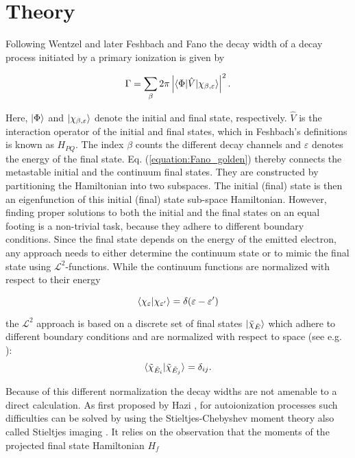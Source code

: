 \section{Theory}
\label{section:theory}

Following Wentzel \cite{Wentzel27} and later Feshbach \cite{Feshbach58,Feshbach62}
and Fano \cite{Fano61}
the decay width of a decay process initiated by a
primary ionization is given by 

\begin{equation} \label{equation:Fano_golden}
  \Gamma = \sum_\beta 2\pi
           \left| \braket{\Phi|\hat{V}|\chi_{\beta,\varepsilon}} \right|^2 .
\end{equation}

Here, $\ket{\Phi}$ and $\ket{\chi_{\beta,\varepsilon}}$ denote the initial and
final state, respectively. $\hat{V}$ is the interaction operator of the
initial and final states, which in Feshbach's definitions is known as $H_{PQ}$.
The index $\beta$ counts the different
decay channels and $\varepsilon$ denotes the energy of the final state.
Eq. (\ref{equation:Fano_golden}) thereby connects the metastable initial
and the continuum final states. They are constructed by partitioning the
Hamiltonian into two subspaces. The initial (final) state is then an
eigenfunction of this initial (final) state sub-space Hamiltonian.
However, finding proper solutions to both the initial and the final
states on an equal footing is a non-trivial task, because they adhere to
different boundary conditions. Since the final state depends on the energy
of the emitted electron, any approach needs to either determine the continuum
state or to mimic the final state using $\mathcal{L}^2$-functions.
While the continuum functions are normalized with respect to their energy

\begin{equation}
 \braket{\chi_\varepsilon| \chi_{\varepsilon'}} = \delta(\varepsilon-\varepsilon')
\end{equation}

the $\mathcal{L}^2$ approach is based on a discrete set of final states
$\ket{\tilde{\chi}_{\tilde{E}}}$
which adhere to different boundary
conditions and are normalized with respect to space (see e.g. \cite{Craigie14}):
\begin{equation}
 \braket{ \tilde{\chi}_{\tilde{E}_i} | \tilde{\chi}_{\tilde{E}_j} } = \delta_{ij}.
\end{equation}

Because of this different normalization the decay widths are not amenable to
a direct calculation. As first proposed by Hazi \cite{hazi1978}, for
autoionization processes such difficulties
can be solved by using the
Stieltjes-Chebyshev moment theory also called Stieltjes imaging
\cite{Langhoff76,Corcoran77,MuellerPlathe90}.
It relies on the observation that the moments of the projected final
state Hamiltonian $H_f$

